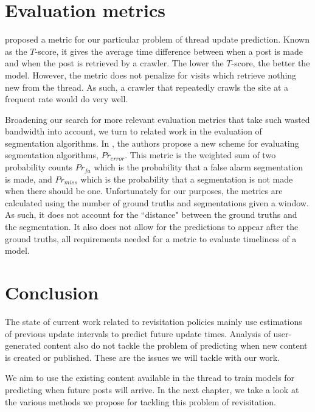 \section{Evaluation metrics}
 proposed a metric for our particular problem of thread update 
prediction. Known as the $T$-score, it gives the average time difference between 
when a post is made and when the post is retrieved by a crawler. The lower the 
$T$-score, the better the model. However, the metric does not penalize for 
visits which retrieve nothing new from the thread.  As such, a crawler that 
repeatedly crawls the site at a frequent rate would do very well.

Broadening our search for more relevant evaluation metrics that take such
wasted bandwidth into account, we turn to related work in the evaluation of
segmentation algorithms.  In , the authors propose a
new scheme for evaluating segmentation algorithms, $Pr_{error}$. 
This metric is the weighted sum of two 
probability counts $Pr_{fa}$ which is the probability that a false alarm 
segmentation is made, and $Pr_{miss}$ which is the probability that a 
segmentation is not made when there should be one. Unfortunately for our 
purposes, the metrics are calculated using the number of ground truths and 
segmentations given a window. As such, it does not account for the ``distance" 
between the ground truths and the segmentation. It also does not allow for the 
predictions to appear after the ground truths, all requirements needed for a 
metric to evaluate timeliness of a model.

\section{Conclusion}
The state of current work related to revisitation policies mainly use 
estimations of previous update intervals to predict future update times.  
Analysis of user-generated content also do not tackle the problem of predicting 
when new content is created or published. These are the issues we will tackle 
with our work.

We aim to use the existing content available in the thread to train models for 
predicting when future posts will arrive. In the next chapter, we take a look at 
the various methods we propose for tackling this problem of revisitation.
